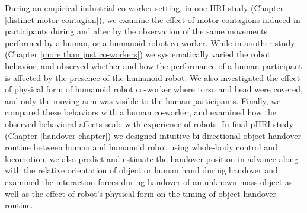 During an empirical industrial co-worker setting, in one HRI study (Chapter \ref{distinct motor contagion}), we examine the effect of motor contagions induced in participants during and after by the observation of the same movements performed by a human, or a humanoid robot co-worker. While in  another study (Chapter \ref{more than just co-workers}) we systematically varied the robot behavior, and observed whether and how the performance of a human participant is affected by the presence of the humanoid robot. We also investigated the effect of physical form of humanoid robot co-worker where torso and head were covered, and only the moving arm was visible to the human participants. Finally, we compared these behaviors with a human co-worker, and examined how the observed behavioral affects scale with experience of robots. In final pHRI study (Chapter \ref{handover chapter}) we designed intuitive bi-directional object handover routine between human and humanoid robot using whole-body control and locomotion, we also predict and estimate the handover position in advance along with the relative orientation of object or human hand during handover and examined the interaction forces during handover of an unknown mass object as well as the effect of robot's physical form on the timing of object handover routine.


%
%
%


\clearpage
